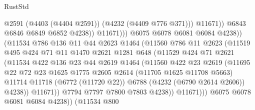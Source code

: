 \begin{lexlean}{RustStd}
\begin{coremodule}
                                      @2591
                                      (@4403 (@4404 @2591))
                                      (@4232 (@4409 @776 @371)))
                                    @11671))
                                @6843
                                @6846
                                @6849
                                @6852
                                @4238))
                            @11671)))
                      @6075
                      @6078
                      @6081
                      @6084
                      @4238))
                  (@11534
                    @786
                    @136
                    @11
                    @44
                    @2623
                    @1464
                    (@11560
                      @786
                      @11
                      @2623
                      (@11519
                        @495
                        @424
                        @71
                        @11
                        @1470
                        @2621
                        @1281
                        @648
                        (@11529
                          @424
                          @71
                          @2621
                          (@11534
                            @422
                            @136
                            @23
                            @44
                            @2619
                            @1464
                            (@11560
                              @422
                              @23
                              @2619
                              (@11695
                                @22
                                @72
                                @23
                                @1625
                                @1775
                                @2605
                                @2614
                                (@11705 @1625 @11708 @5663)
                                @11714
                                @11718
                                (@6772 (@11720 @22))
                                @6788
                                (@4232 (@6790 @2614 @2606))
                                @4238))
                            @11671))
                        @7794
                        @7797
                        @7800
                        @7803
                        @4238))
                    @11671)))
              @6075
              @6078
              @6081
              @6084
              @4238))
          (@11534
            @800

\end{coremodule}
\end{lexlean}
